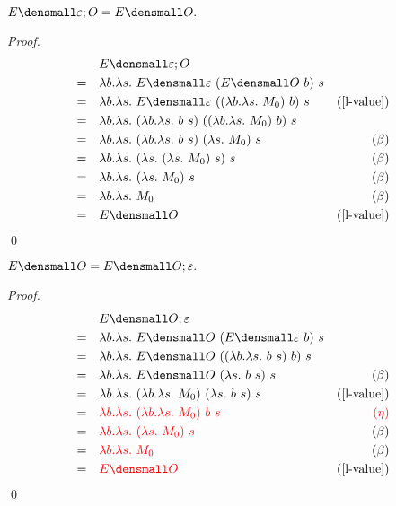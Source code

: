 \begin{theorem}
    $ E\den{\varepsilon; O} = E\den{O}.$
    \begin{proof}
        \begin{align*}
            &\quad E\den{\varepsilon; O} \\
            =& \quad \lambda b. \lambda s.~ E\den{\varepsilon} ~(E\den{O} ~b) ~s \\
            =&  \quad \lambda b. \lambda s.~ E\den{\varepsilon} ~((\lambda b. \lambda s.~ M_0) ~b) ~s & (\cref{l-value})\\
            =& \quad \lambda b. \lambda s.~ (\lambda b. \lambda s.~ b ~s) ~((\lambda b. \lambda s.~ M_0) ~b) ~s \\
            =& \quad \lambda b. \lambda s.~ (\lambda b. \lambda s.~ b ~s) ~(\lambda s.~ M_0) ~s & (\beta)\\
            =& \quad \lambda b. \lambda s.~ (\lambda s.~ (\lambda s.~ M_0) ~s) ~s & (\beta)\\
            =& \quad \lambda b. \lambda s.~ (\lambda s.~ M_0) ~s & (\beta)\\
            =& \quad \lambda b. \lambda s.~ M_0 & (\beta) \\
            =& \quad E\den{O} & (\cref{l-value})
        \end{align*}
        \qed
    \end{proof}
\end{theorem}

\begin{theorem}
    $ E\den{O} = E\den{O;\varepsilon}.$
    \begin{proof}
        \begin{align*}
            &\quad E\den{O;\varepsilon} \\
            =& \quad \lambda b. \lambda s.~ E\den{O} ~(E\den{\varepsilon} ~b) ~s \\
            =& \quad \lambda b. \lambda s.~ E\den{O} ~((\lambda b. \lambda s.~ b ~s) ~b) ~s \\
            =& \quad \lambda b. \lambda s.~ E\den{O} ~(\lambda s.~ b ~s) ~s & (\beta)\\
            =& \quad \lambda b. \lambda s.~ (\lambda b. \lambda s.~ M_0) ~(\lambda s.~ b ~s) ~s & (\cref{l-value})\\
            =& \quad \color{red}{\lambda b. \lambda s.~ (\lambda b. \lambda s.~ M_0) ~b ~s} & \color{red}{(\eta)}\\
            =& \quad \color{red}{\lambda b. \lambda s.~ (\lambda s.~ M_0) ~s} & (\beta)\\
            =& \quad \color{red}{\lambda b. \lambda s.~ M_0} & (\beta) \\
            =& \quad \color{red}{E\den{O}} & (\cref{l-value})
        \end{align*}
        \qed
    \end{proof}
\end{theorem}

